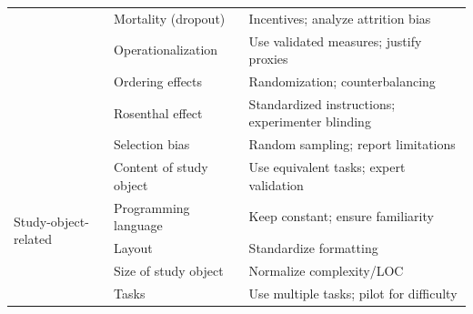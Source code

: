 \begin{table}[t]
\begin{tabular}{p{4cm} p{5.5cm} p{6.5cm}}
& Mortality (dropout) 
& Incentives; analyze attrition bias \\

& Operationalization 
& Use validated measures; justify proxies \\

& Ordering effects 
& Randomization; counterbalancing \\

& Rosenthal effect 
& Standardized instructions; experimenter blinding \\

& Selection bias 
& Random sampling; report limitations \\

\midrule

\multirow{5}{*}{Study-object-related}
& Content of study object 
& Use equivalent tasks; expert validation \\

& Programming language 
& Keep constant; ensure familiarity \\

& Layout 
& Standardize formatting \\

& Size of study object 
& Normalize complexity/LOC \\

& Tasks 
& Use multiple tasks; pilot for difficulty \\

\bottomrule
\end{tabular}
\end{table}

